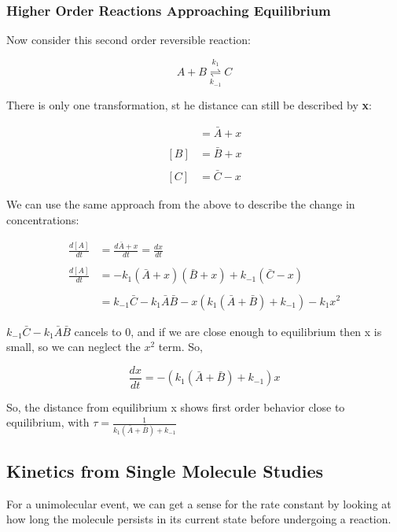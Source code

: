 \documentclass[12pt, letterpaper]{article}
\begin{document}
\subsubsection*{Higher Order Reactions Approaching Equilibrium}

Now consider this second order reversible reaction:

\begin{equation*}
    A + B \stackrel{k_1}{\underset{k_{-1}}{\rightleftharpoons}} C
\end{equation*}

There is only one transformation, st he distance can still be described by \textbf{x}:

\begin{align*}
    [A] &= \bar{A} + x \\ \\ 
    [B] &= \bar{B} + x \\ \\
    [C] &= \bar{C} - x
\end{align*}

We can use the same approach from the above to describe the change in concentrations: 

\begin{align*}
    \frac{d[A]}{dt} &= \frac{d\bar{A} + x}{dt} = \frac{dx}{dt} \\ \\
    \frac{d[A]}{dt} &= -k_1(\bar{A} + x)(\bar{B} + x) + k_{-1}(\bar{C} - x) \\ \\ 
    &= k_{-1}\bar{C} - k_1\bar{A}\bar{B} - x(k_1(\bar{A} + \bar{B}) + k_{-1}) - k_1x^2
\end{align*}

\( k_{-1}\bar{C} - k_1\bar{A}\bar{B} \) cancels to 0, and if we are close enough to equilibrium then x is small, so we can neglect the $x^2$ term. 
So, 

\begin{equation}
    \frac{dx}{dt} = -(k_1(\bar{A} + \bar{B}) + k_{-1})x
\end{equation}

So, the distance from equilibrium x shows first order behavior close to equilibrium, with \( \tau = \frac{1}{k_1(\bar{A} + \bar{B}) + k_{-1}} \)

\newpage

\subsection*{Kinetics from Single Molecule Studies}
For a unimolecular event, we can get a sense for the rate constant by looking at how long the molecule
persists in its current state before undergoing a reaction. 
\end{document}
